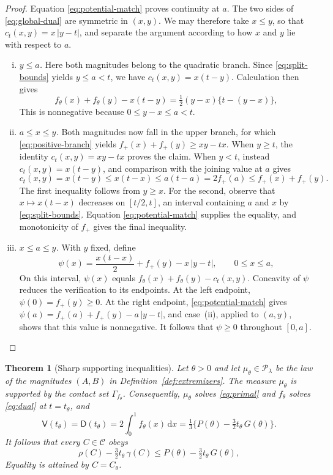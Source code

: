 \documentclass{article}
\newtheorem{theorem}{Theorem}[section]
\theoremstyle{definition}
\theoremstyle{remark}
\newcommand{\1}{\mathds{1}}
\newcommand{\de}{\,\mathrm{d}}
\newcommand{\CC}{\mathcal{C}}
\newcommand{\couplings}{\mathcal{P}_\lambda}
\begin{document}
\begin{proof}
	Equation \eqref{eq:potential-match} proves continuity at $a$.
	The two sides of \eqref{eq:global-dual} are symmetric in $(x,y)$. We may therefore take $x\le y$, so that $c_t(x,y)=x\,|y-t|$, and separate the argument according to how $x$ and $y$ lie with respect to $a$.
	\begin{enumerate}[(i)]
		\item\emph{$y\le a$.}
		Here both magnitudes belong to the quadratic branch. Since \eqref{eq:split-bounds} yields $y\le a<t$, we have $c_t(x,y)=x(t-y)$.
		Calculation then gives
		\[
			f_\theta(x)+f_\theta(y)-x(t-y)=\tfrac12(y-x)\bigl\{t-(y-x)\bigr\},
		\]
		This is nonnegative because $0\le y-x\le a<t$.
		\item\emph{$a\le x\le y$.}
		Both magnitudes now fall in the upper branch, for which \eqref{eq:positive-branch} yields $f_+(x)+f_+(y)\ge xy-tx$.
		When $y\ge t$, the identity $c_t(x,y)=xy-tx$ proves the claim.
		When $y<t$, instead $c_t(x,y)=x(t-y)$, and comparison with the joining value at $a$ gives
		\[
			c_t(x,y)=x(t-y)\le x(t-x)\le a(t-a)=2f_+(a)\le f_+(x)+f_+(y).
		\]
		The first inequality follows from $y\ge x$. For the second, observe that $x\mapsto x(t-x)$ decreases on $[t/2,t]$, an interval containing $a$ and $x$ by \eqref{eq:split-bounds}. Equation \eqref{eq:potential-match} supplies the equality, and monotonicity of $f_+$ gives the final inequality.
		\item\emph{$x\le a\le y$.}
		With $y$ fixed, define
		\[
			\psi(x)=\frac{x(t-x)}{2}+f_+(y)-x\,|y-t|,\qquad0\le x\le a,
		\]
		On this interval, $\psi(x)$ equals $f_\theta(x)+f_\theta(y)-c_t(x,y)$.
		Concavity of $\psi$ reduces the verification to its endpoints.
		At the left endpoint, $\psi(0)=f_+(y)\ge0$.
		At the right endpoint, \eqref{eq:potential-match} gives $\psi(a)=f_+(a)+f_+(y)-a\,|y-t|$, and case~(ii), applied to $(a,y)$, shows that this value is nonnegative.
		It follows that $\psi\ge0$ throughout $[0,a]$.\qedhere
	\end{enumerate}
\end{proof}

\begin{theorem}[Sharp supporting inequalities]\label{thm:support}
	Let $\theta>0$ and let $\mu_\theta\in\couplings$ be the law of the magnitudes $(A,B)$ in Definition~\ref{def:extremizers}.
	The measure $\mu_\theta$ is supported by the contact set $\Gamma_{f_\theta}$. Consequently, $\mu_\theta$ solves \eqref{eq:primal} and $f_\theta$ solves \eqref{eq:dual} at $t=t_\theta$, and
	\begin{equation}\label{eq:value}
		\mathsf V(t_\theta)=\mathsf D(t_\theta)=2\int_0^1f_\theta(x)\de x=\tfrac13\bigl\{P(\theta)-\tfrac32t_\theta\,G(\theta)\bigr\}.
	\end{equation}
	It follows that every $C\in\CC$ obeys
	\begin{equation}\label{eq:sharp-support}
		\rho(C)-\tfrac32t_\theta\,\gamma(C)\le P(\theta)-\tfrac32t_\theta\,G(\theta),
	\end{equation}
	Equality is attained by $C=C_\theta$.
\end{theorem}
\end{document}
